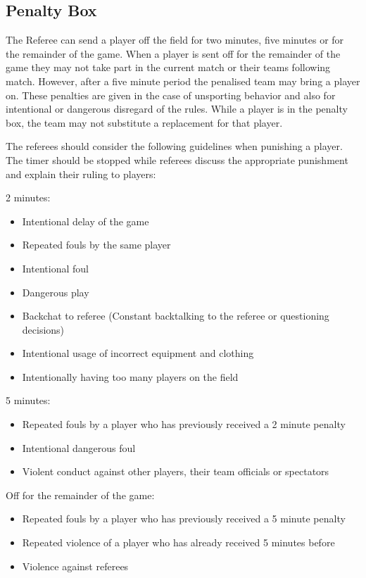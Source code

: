 \subsection{Penalty Box}
The Referee can send a player off the field for two minutes, five minutes or for the remainder of the game.
When a player is sent off for the remainder of the game they may not take part in the current match or their teams following match.
However, after a five minute period the penalised team may bring a player on.
These penalties are given in the case of unsporting behavior and also for intentional or dangerous disregard of the rules.
While a player is in the penalty box, the team may not substitute a replacement for that player.

The referees should consider the following guidelines when punishing a player.
The timer should be stopped while referees discuss the appropriate punishment and explain their ruling to players:

2 minutes:
\begin{itemize}
\item Intentional delay of the game
\item Repeated fouls by the same player
\item Intentional foul
\item Dangerous play
\item Backchat to referee (Constant backtalking to the referee or questioning decisions)
\item Intentional usage of incorrect equipment and clothing
\item Intentionally having too many players on the field
\end{itemize}
5 minutes:
\begin{itemize}
\item Repeated fouls by a player who has previously received a 2 minute penalty
\item Intentional dangerous foul
\item Violent conduct against other players, their team officials or spectators
\end{itemize}
Off for the remainder of the game:
\begin{itemize}
\item Repeated fouls by a player who has previously received a 5 minute penalty
\item Repeated violence of a player who has already received 5 minutes before
\item Violence against referees
\end{itemize}

